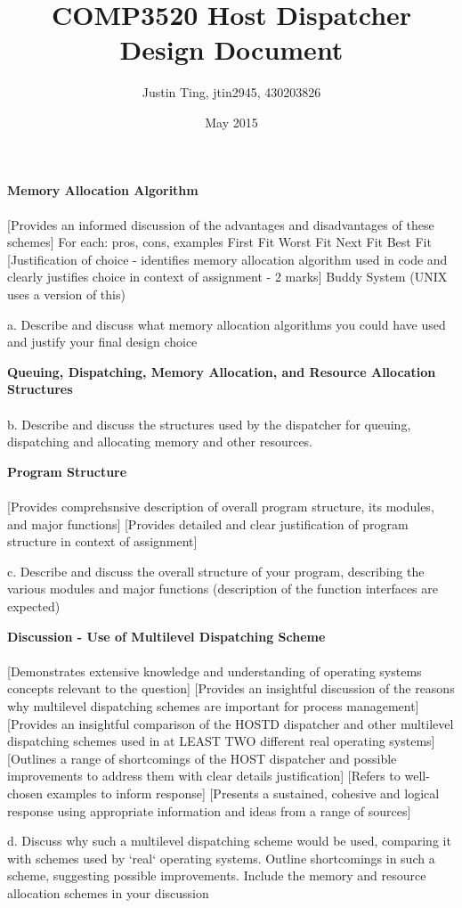 \documentclass[11pt]{article}
\title {COMP3520 Host Dispatcher Design Document}
\author {Justin Ting, jtin2945, 430203826}
\date {May 2015}
\begin{document}
\maketitle

{\large\textbf{Memory Allocation Algorithm}}\\\\
[Provides a thorough description of ALL prescribed memory allocation schemes - 6 marks]
[Provides an informed discussion of the advantages and disadvantages of these schemes]
For each: pros, cons, examples
First Fit
Worst Fit
Next Fit
Best Fit
[Justification of choice - identifies memory allocation algorithm used in code and clearly justifies choice in context of assignment - 2 marks]
Buddy System (UNIX uses a version of this)

a. Describe and discuss what memory allocation algorithms you could have used
and justify your final design choice

{\large\textbf{Queuing, Dispatching, Memory Allocation, and Resource Allocation
Structures}}\\\\
[Provides thorough description of ALL dispatcher structures that are relevant to host dispatcher implementation - 5 marks + 1 bonus]

b. Describe and discuss the structures used by the dispatcher for queuing,
dispatching and allocating memory and other resources.

{\large\textbf{Program Structure}}\\\\
[12 marks + 3 bonus]
[Provides comprehsnsive description of overall program structure, its modules, and major functions]
[Provides detailed and clear justification of program structure in context of assignment]

c. Describe and discuss the overall structure of your program, describing the
various modules and major functions (description of the function interfaces are
expected)

{\large\textbf{Discussion - Use of Multilevel Dispatching Scheme}}\\\\
[20 marks + 5 bonus]
[Demonstrates extensive knowledge and understanding of operating systems concepts relevant to the question]
[Provides an insightful discussion of the reasons why multilevel dispatching schemes are important for process management]
[Provides an insightful comparison of the HOSTD dispatcher and other multilevel dispatching schemes used in at LEAST TWO different real operating systems]
[Outlines a range of shortcomings of the HOST dispatcher and possible improvements to address them with clear details justification]
[Refers to well-chosen examples to inform response]
[Presents a sustained, cohesive and logical response using appropriate information and ideas from a range of sources]

d. Discuss why such a multilevel dispatching scheme would be used, comparing
it with schemes used by `real` operating systems. Outline shortcomings in such a
scheme, suggesting possible improvements. Include the memory and resource
allocation schemes in your discussion
\end{document}
